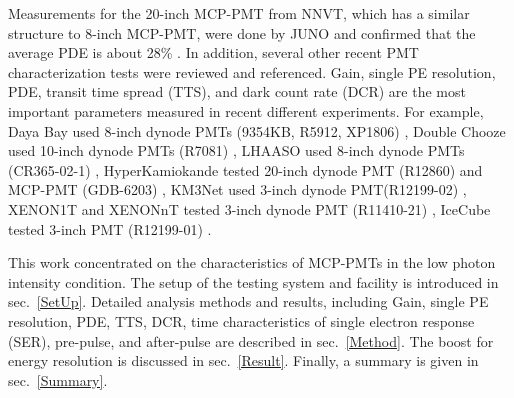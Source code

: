 Measurements for the 20-inch MCP-PMT from NNVT, which has a similar structure to 8-inch MCP-PMT, were done by JUNO and confirmed that the average PDE is about 28\% \cite{JUNOMassTesting}. In addition, several other recent PMT characterization tests were reviewed and referenced. Gain, single PE resolution, PDE, transit time spread (TTS), and dark count rate (DCR) are the most important parameters measured in recent different experiments. For example, Daya Bay used 8-inch dynode PMTs (9354KB, R5912, XP1806) \cite{DayaBayTesting}, Double Chooze used 10-inch dynode PMTs (R7081) \cite{DoubleChoozeTesting}, LHAASO used 8-inch dynode PMTs (CR365-02-1) \cite{LHAASOTesting}, HyperKamiokande tested 20-inch dynode PMT (R12860) and MCP-PMT (GDB-6203) \cite{HyperKTesting}, KM3Net used 3-inch dynode PMT(R12199-02) \cite{KM3NetTesting}, XENON1T and XENONnT tested 3-inch dynode PMT (R11410-21) \cite{XENON1TTesting}\cite{XENONnTTesting}, IceCube tested 3-inch PMT (R12199-01) \cite{IceCubeTesting}.

This work concentrated on the characteristics of MCP-PMTs in the low photon intensity condition. The setup of the testing system and facility is introduced in sec.~\ref{SetUp}. Detailed analysis methods and results, including Gain, single PE resolution, PDE, TTS, DCR, time characteristics of single electron response (SER), pre-pulse, and after-pulse are described in sec.~\ref{Method}. The boost for energy resolution is discussed in sec.~\ref{Result}. Finally, a summary is given in sec.~\ref{Summary}.
